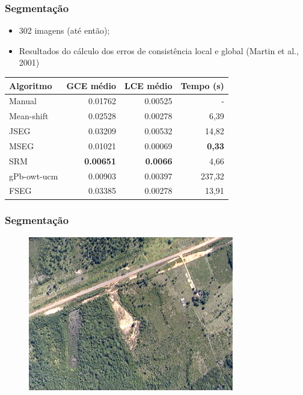 \documentclass[t]{beamer}
\begin{document}
\begin{frame}
	\frametitle{Segmentação}

	\begin{itemize}
		\item 302 imagens (até então);
		\item Resultados do cálculo dos erros de consistência local e global (Martin et al., 2001)
	\end{itemize}

	\small{
	\begin{table}
	\centering
	\begin{tabulary}{\linewidth}{|L|R|R|R|}
		\hline
		\textbf{Algoritmo} & \textbf{GCE médio} & \textbf{LCE médio} & \textbf{Tempo (s)} \\ \hline
		Manual      & 0.01762          & 0.00525 & - \\ \hline
		Mean-shift  & 0.02528          & 0.00278 & 6,39 \\ \hline
		JSEG        & 0.03209          & 0.00532 & 14,82 \\ \hline
		MSEG        & 0.01021          & 0.00069 & \textbf{0,33} \\ \hline
		SRM         & \textbf{0.00651} & \textbf{0.0066} & 4,66 \\ \hline
		gPb-owt-ucm & 0.00903 & 0.00397 & 237,32 \\ \hline
		FSEG        & 0.03385 & 0.00278 & 13,91 \\ \hline
	\end{tabulary}
	\end{table}
	}

\end{frame}

\begin{frame}[c]
	\frametitle{Segmentação}

	\begin{figure}[c]
  		\centering
		\includegraphics[width=0.8\textwidth]{imgs/seg_original}
	\end{figure}

\end{frame}
\end{document}
